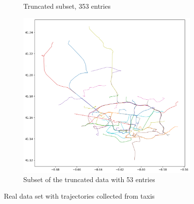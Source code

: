 \begin{figure}[h!]
\begin{subfigure}{.451\textwidth}
    \caption{Truncated subset, 353 entries}
    \label{sfig:real-trunc}
\end{subfigure}
\begin{subfigure}{.451\textwidth}
    \centering
    \includegraphics[width=\textwidth]{figs/traj/REAL_TRUNC_MINI.png}
    \caption{Subset of the truncated data with 53 entries}
    \label{sfig:real-trunc-mini}
\end{subfigure}
\caption{Real data set with trajectories collected from taxis}
\label{fig:real-datasets}
\end{figure}


